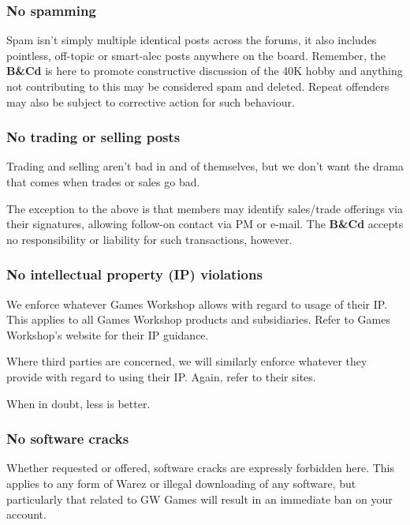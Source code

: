 \documentclass[12pt]{article}
\newcommand{\BnC}{{\textbf{B\&Cd}}}%
\begin{document}
\subsubsection{No spamming}

Spam isn't simply multiple identical posts across the forums, it also 
includes pointless, off-topic or smart-alec posts anywhere on the 
board. Remember, the {\BnC} is here to promote constructive discussion of 
the 40K hobby and anything not contributing to this may be considered 
spam and deleted. Repeat offenders may also be subject to corrective 
action for such behaviour.

\subsubsection{No trading or selling posts}

Trading and selling aren't bad in and of themselves, but we don't want 
the drama that comes when trades or sales go bad.

The exception to the above is that members may identify sales/trade 
offerings via their signatures, allowing follow-on contact via PM or 
e-mail. The {\BnC} accepts no responsibility or liability for such 
transactions, however.

\subsubsection{No intellectual property (IP) violations}

We enforce whatever Games Workshop allows with regard to usage of their 
IP. This applies to all Games Workshop products and subsidiaries. Refer 
to Games Workshop's website for their IP guidance.

Where third parties are concerned, we will similarly enforce whatever 
they provide with regard to using their IP. Again, refer to their sites.

When in doubt, less is better.

\subsubsection{No software cracks}

Whether requested or offered, software cracks are expressly forbidden 
here. This applies to any form of Warez or illegal downloading of any 
software, but particularly that related to GW Games will result in an 
immediate ban on your account.
\end{document}
